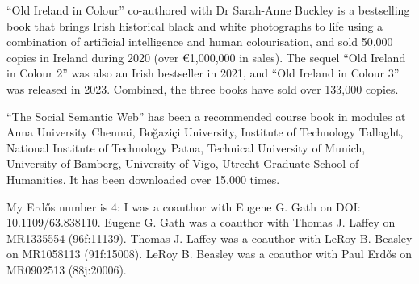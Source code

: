 \documentclass[10pt,a4paper]{res} %
\begin{document}
\begin{resume}
``Old Ireland in Colour'' co-authored with Dr Sarah-Anne Buckley is a bestselling book that brings Irish historical black and white photographs to life using a combination of artificial intelligence and human colourisation, and sold 50,000 copies in Ireland during 2020 (over \euro{}1,000,000 in sales). The sequel ``Old Ireland in Colour 2'' was also an Irish bestseller in 2021, and ``Old Ireland in Colour 3'' was released in 2023. Combined, the three books have sold over 133,000 copies.

``The Social Semantic Web'' has been a recommended course book in modules at Anna University Chennai, Bo\u{g}azi\c{c}i University, Institute of Technology Tallaght, National Institute of Technology Patna, Technical University of Munich, University of Bamberg, University of Vigo, Utrecht Graduate School of Humanities. It has been downloaded over 15,000 times. 




My Erd\H{o}s number is 4: I was a coauthor with Eugene G. Gath on DOI: 10.1109/63.838110. Eugene G. Gath was a coauthor with Thomas J. Laffey on MR1335554 (96f:11139). Thomas J. Laffey was a coauthor with LeRoy B. Beasley on MR1058113 (91f:15008). LeRoy B. Beasley was a coauthor with Paul Erd\H{o}s on MR0902513 (88j:20006).


\end{resume}
\end{document}

